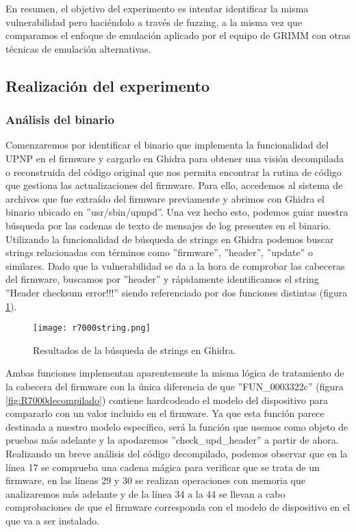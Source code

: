 En resumen, el objetivo del experimento es intentar identificar la misma vulnerabilidad pero haciéndolo a través de fuzzing, a la misma vez que comparamos el enfoque de 
emulación aplicado por el equipo de GRIMM con otras técnicas de emulación alternativas.

\subsection{Realización del experimento}
\subsubsection{Análisis del binario}
Comenzaremos por identificar el binario que implementa la funcionalidad del UPNP en el firmware y cargarlo en Ghidra\cite{Ghidra} para obtener una visión
decompilada o reconstruida del código original que nos permita encontrar la rutina de código que gestiona las actualizaciones del firmware. Para ello, 
accedemos al sistema de archivos que fue extraído del firmware previamente y abrimos con Ghidra el binario ubicado en ''usr/sbin/upnpd''. Una vez 
hecho esto, podemos guiar nuestra búsqueda por las cadenas de texto de mensajes de log presentes en el binario. Utilizando la funcionalidad de búsqueda 
de strings en Ghidra podemos buscar strings relacionadas con términos como ''firmware'', ''header'', ''update'' o similares. Dado que la vulnerabilidad 
se da a la hora de comprobar las cabeceras del firmware, buscamos por ''header'' y rápidamente identificamos el string ''Header checksum error!!!'' 
siendo referenciado por dos funciones distintas (figura \ref{fig:R7000string}).

\begin{figure}[H]
    \centering
    \texttt{[image: r7000string.png]}
    \caption{Resultados de la búsqueda de strings en Ghidra.}
    \label{fig:R7000string}
\end{figure}

Ambas funciones implementan aparentemente la misma lógica de tratamiento de la cabecera del firmware con la única diferencia de que ''FUN\_0003322c''
(figura \ref{fig:R7000decompilado}) contiene hardcodeado el modelo del dispositivo para compararlo con un valor incluido en el firmware. 
Ya que esta función parece destinada a nuestro modelo específico, será la función que usemos como objeto de pruebas más adelante y la apodaremos 
''check\_upd\_header'' a partir de ahora. Realizando un breve 
análisis del código decompilado, podemos observar que en la línea 17 se comprueba una cadena mágica para verificar que se trata de un firmware, 
en las líneas 29 y 30 se realizan operaciones con memoria que analizaremos más adelante y de la línea 34 a la 44 se llevan a cabo comprobaciones de que 
el firmware corresponda con el modelo de dispositivo en el que va a ser instalado.

